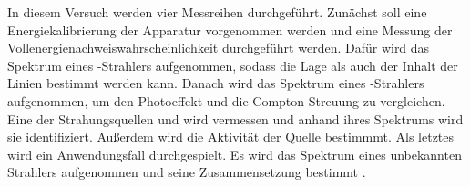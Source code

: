 In diesem Versuch werden vier Messreihen durchgeführt. 
Zunächst soll eine Energiekalibrierung der Apparatur vorgenommen werden und eine 
Messung der Vollenergienachweiswahrscheinlichkeit durchgeführt werden.
Dafür wird das Spektrum eines -Strahlers aufgenommen, sodass die Lage 
als auch der Inhalt der Linien bestimmt werden kann.
Danach wird das Spektrum eines -Strahlers aufgenommen, um den Photoeffekt 
und die Compton-Streuung zu vergleichen.
Eine der Strahungsquellen  und  wird vermessen und anhand ihres 
Spektrums wird sie identifiziert. Außerdem wird die Aktivität der Quelle
bestimmmt.
Als letztes wird ein Anwendungsfall durchgespielt. 
Es wird das Spektrum eines unbekannten Strahlers aufgenommen und  
seine Zusammensetzung bestimmt \cite{sample}.
